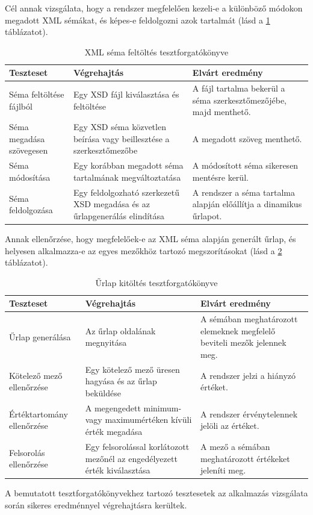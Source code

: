 Cél annak vizsgálata, hogy a rendszer megfelelően kezeli-e a különböző módokon megadott XML sémákat, és képes-e feldolgozni azok tartalmát (lásd a \ref{tab:tesztf2} táblázatot).
\begin{table}[h]
\centering
\caption{XML séma feltöltés tesztforgatókönyve}
\label{tab:tesztf2}
\begin{tabular}{|p{}|p{}|p{}|}
\hline
Teszteset & Végrehajtás & Elvárt eredmény \\
\hline
Séma feltöltése fájlból & Egy XSD fájl kiválasztása és feltöltése & A fájl tartalma bekerül a séma szerkesztőmezőjébe, majd menthető. \\
\hline
Séma megadása szövegesen & Egy XSD séma közvetlen beírása vagy beillesztése a szerkesztőmezőbe & A megadott szöveg menthető. \\
\hline
Séma módosítása & 	Egy korábban megadott séma tartalmának megváltoztatása & A módosított séma sikeresen mentésre kerül. \\
\hline
Séma feldolgozása & Egy feldolgozható szerkezetű XSD megadása és az űrlapgenerálás elindítása & A rendszer a séma tartalma alapján előállítja a dinamikus űrlapot. \\
\hline
\end{tabular}
\end{table}

Annak ellenőrzése, hogy megfelelőek-e az XML séma alapján generált űrlap, és helyesen alkalmazza-e az egyes mezőkhöz tartozó megszorításokat (lásd a \ref{tab:tesztf3} táblázatot).
\begin{table}[h]
\centering
\caption{Űrlap kitöltés tesztforgatókönyve}
\label{tab:tesztf3}
\begin{tabular}{|p{}|p{}|p{}|}
\hline
Teszteset & Végrehajtás & Elvárt eredmény \\
\hline
Űrlap generálása & Az űrlap oldalának megnyitása & A sémában meghatározott elemeknek megfelelő beviteli mezők jelennek meg. \\
\hline
Kötelező mező ellenőrzése & Egy kötelező mező üresen hagyása és az űrlap beküldése & A rendszer jelzi a hiányzó értéket. \\
\hline
Értéktartomány ellenőrzése & A megengedett minimum- vagy maximumértéken kívüli érték megadása & A rendszer érvénytelennek jelöli az értéket. \\
\hline
Felsorolás ellenőrzése & Egy felsorolással korlátozott mezőnél az engedélyezett érték kiválasztása & A mező a sémában meghatározott értékeket jeleníti meg. \\
\hline
\end{tabular}
\end{table}

A bemutatott tesztforgatókönyvekhez tartozó tesztesetek az alkalmazás vizsgálata során sikeres eredménnyel végrehajtásra kerültek.
